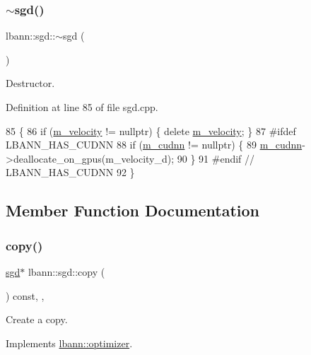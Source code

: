 \subsubsection{\texorpdfstring{$\sim$sgd()}{~sgd()}}
{\footnotesize\ttfamily lbann\+::sgd\+::$\sim$sgd (\begin{DoxyParamCaption}{ }\end{DoxyParamCaption})\hspace{0.3cm}{\ttfamily [override]}}

Destructor. 

Definition at line 85 of file sgd.\+cpp.


\begin{DoxyCode}
85           \{
86   \textcolor{keywordflow}{if} (\hyperlink{classlbann_1_1sgd_a27f2d893014cef8357edffb63bf649f0}{m\_velocity} != \textcolor{keyword}{nullptr}) \{ \textcolor{keyword}{delete} \hyperlink{classlbann_1_1sgd_a27f2d893014cef8357edffb63bf649f0}{m\_velocity}; \}
87 \textcolor{preprocessor}{  #ifdef LBANN\_HAS\_CUDNN}
88   \textcolor{keywordflow}{if} (\hyperlink{classlbann_1_1optimizer_a2f24dbeaca18b06f4aa7d179bbf96680}{m\_cudnn} != \textcolor{keyword}{nullptr}) \{
89     \hyperlink{classlbann_1_1optimizer_a2f24dbeaca18b06f4aa7d179bbf96680}{m\_cudnn}->deallocate\_on\_gpus(m\_velocity\_d);
90   \}
91 \textcolor{preprocessor}{  #endif // LBANN\_HAS\_CUDNN}
92 \}
\end{DoxyCode}


\subsection{Member Function Documentation}
\mbox{\label{classlbann_1_1sgd_a91572d383ad42584bf917e7d62bebe82}} 
\subsubsection{\texorpdfstring{copy()}{copy()}}
{\footnotesize\ttfamily \hyperlink{classlbann_1_1sgd}{sgd}$\ast$ lbann\+::sgd\+::copy (\begin{DoxyParamCaption}{ }\end{DoxyParamCaption}) const\hspace{0.3cm}{\ttfamily [inline]}, {\ttfamily [override]}, {\ttfamily [virtual]}}

Create a copy. 

Implements \hyperlink{classlbann_1_1optimizer_adf19a1d19d832ebfe70072cc202cdf39}{lbann\+::optimizer}.



